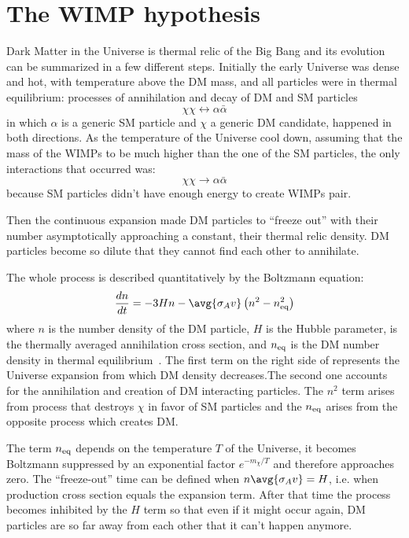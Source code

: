 \section{The WIMP hypothesis}
\label{sec:wimp}
Dark Matter in the Universe is thermal relic of the Big Bang and its evolution can be summarized in a few different steps. Initially the early Universe was dense and hot, with temperature above the DM mass, and all particles were in thermal equilibrium: processes of annihilation and decay of DM and SM particles 
\begin{equation}
\chi\chi\longleftrightarrow \alpha\bar{\alpha}
\end{equation}
in which $\alpha$ is a generic SM particle and $\chi$ a generic DM candidate, happened in both directions. As the temperature of the Universe cool down, assuming that the mass of the WIMPs to be much higher than the one of the SM particles, the only interactions that occurred was:
\begin{equation}
\chi\chi\rightarrow \alpha\bar{\alpha}
\label{chitosm}
\end{equation}
because SM particles didn't have enough energy to create WIMPs pair.

Then the continuous expansion made DM particles to ``freeze out'' with their number asymptotically approaching a constant, their thermal relic density. DM particles become so dilute that they cannot find each other to annihilate. 

The whole process is described quantitatively by the Boltzmann equation:
\begin{equation}
\frac{dn}{dt}=-3Hn-\avg{\sigma_A v}\left(n^2-n_{\textup{eq}}^2\right)
\label{eqn:boltz}
\end{equation}
where $n$ is the number density of the DM particle, $H$ is the Hubble parameter,  is the thermally averaged annihilation cross section, and $n_{\textup{eq}}$ is the DM number density in thermal equilibrium~\cite{feng:DM}. The first term on the right side of \Eqn{\ref{eqn:boltz}} represents the Universe expansion from which DM density decreases.The second one accounts for the annihilation and creation of DM interacting particles. The $n^2$ term arises from \Eqn{\ref{chitosm}} process that destroys $\chi$ in favor of SM particles and the $n_\textup{eq}$ arises from the opposite process which creates DM.

The term $n_\textup{eq}$ depends on the temperature $T$ of the Universe, it becomes Boltzmann suppressed by an exponential factor $e^{-m_\chi/T}$ and therefore approaches zero. The ``freeze-out'' time can be defined when $n\avg{\sigma_A v} = H$, i.e. when production cross section equals the expansion term. After that time the \Eqn{\ref{chitosm}} process becomes inhibited by the $H$ term so that even if it might occur again, DM particles are so far away from each other that it can't happen anymore.  

